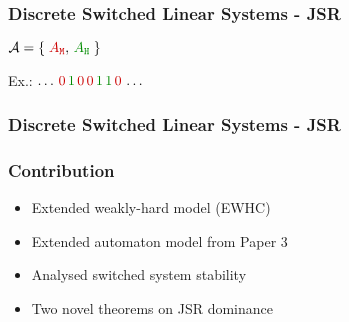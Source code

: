 \begin{frame}
    \frametitle{Discrete Switched Linear Systems - JSR}
    \begin{minipage}{0.59\textwidth}
        \begin{figure}[h]
            \centering
            
        \end{figure}
    \end{minipage}\hfill
    \begin{minipage}{0.39\textwidth}
        \begin{figure}[h]
            \centering
        \end{figure}
    \end{minipage}

    \begin{minipage}{0.59\textwidth}
        \centering
        \large
        $\mathcal{A} = \left\{ \;\textcolor{red!80!black}{A_{\texttt{M}}}, \,\textcolor{lqgcolour}{A_{\texttt{H}}}\; \right\}$
    \end{minipage}\hfill
    \begin{minipage}{0.39\textwidth}
        \centering
        \large
        Ex.: $\dots \,\textcolor{red!80!black}{0} \, \textcolor{lqgcolour}{1} \, \textcolor{red!80!black}{0} \, \textcolor{red!80!black}{0} \, \textcolor{lqgcolour}{1} \, \textcolor{lqgcolour}{1}\, \textcolor{red!80!black}{0} \,\dots$
    \end{minipage}
\end{frame}


\begin{frame}
    \frametitle{Discrete Switched Linear Systems - JSR}
    \begin{figure}[h]
        \centering
        
    \end{figure}
\end{frame}


\begin{frame}
    \frametitle{Contribution}
    \begin{itemize}\setlength\itemsep{1em}
        \item Extended weakly-hard model (EWHC)
        \item Extended automaton model from Paper 3
        \item Analysed switched system stability
        \item Two novel theorems on JSR dominance
    \end{itemize}
\end{frame}
